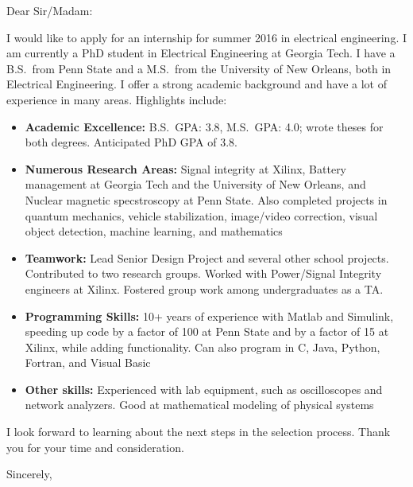 \documentclass[11pt]{letter}
\makeatletter
\renewcommand{\closing}[1]{\par\nobreak\vspace{\parskip}%
  \stopbreaks
  \noindent
  \ifx\@empty\fromaddress\else
  \hspace*{\longindentation}\fi
  \parbox{\indentedwidth}{\raggedright
       \ignorespaces #1\\[2\medskipamount]%
       \ifx\@empty\fromsig
           \fromname
       \else \fromsig \fi\strut}%
   \par}
\makeatother
\begin{document}
\begin{letter}{}
\opening{Dear Sir/Madam:}

I would like to apply for an internship for summer 2016 in electrical engineering.
%
I am currently a PhD student in Electrical Engineering at Georgia Tech. I have a B.S.\ from Penn State and a M.S.\ from the University of New Orleans, both in Electrical Engineering. I offer a strong academic background and have a lot of experience in many areas. Highlights include:

\begin{itemize}
    \item \textbf{Academic Excellence:} B.S.\ GPA: 3.8, M.S.\ GPA: 4.0; wrote theses for both degrees. Anticipated PhD GPA of 3.8.
    \item \textbf{Numerous Research Areas:} Signal integrity at Xilinx, Battery management at Georgia Tech and the University of New Orleans, and Nuclear magnetic specstroscopy at Penn State. Also completed projects in quantum mechanics, vehicle stabilization, image/video correction, visual object detection, machine learning, and mathematics
    \item \textbf{Teamwork:} Lead Senior Design Project and several other school projects. Contributed to two research groups. Worked with Power/Signal Integrity engineers at Xilinx. Fostered group work among undergraduates as a TA.
    \item \textbf{Programming Skills:} 10+ years of experience with Matlab and Simulink, speeding up code by a factor of 100 at Penn State and by a factor of 15 at Xilinx, while adding functionality. Can also program in C, Java, Python, Fortran, and Visual Basic
    \item \textbf{Other skills:} Experienced with lab equipment, such as oscilloscopes and network analyzers. Good at mathematical modeling of physical systems
\end{itemize}


I look forward to learning about the next steps in the selection process. Thank you for your time and consideration.

\closing{Sincerely,}

\end{letter}
\end{document}
